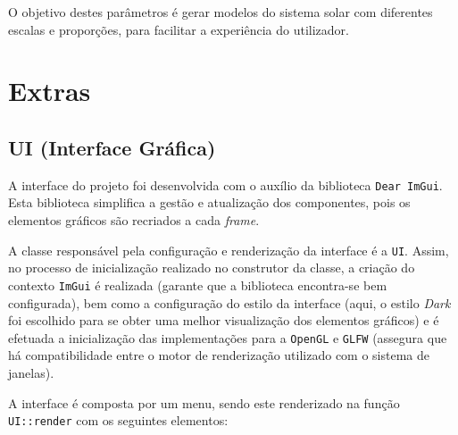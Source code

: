 \documentclass[12pt, a4paper]{article}
\begin{document}
O objetivo destes parâmetros é gerar modelos do sistema solar com diferentes escalas e
proporções, para facilitar a experiência do utilizador.

\section{Extras}

\subsection{UI (Interface Gráfica)}

A interface do projeto foi desenvolvida com o auxílio da biblioteca \texttt{Dear ImGui}. Esta
biblioteca simplifica a gestão e atualização dos componentes, pois os elementos gráficos são
recriados a cada \textit{frame}.

A classe responsável pela configuração e renderização da interface é a \texttt{UI}.
Assim, no processo de inicialização realizado no construtor da classe, a criação do contexto
\texttt{ImGui} é realizada (garante que a biblioteca encontra-se bem configurada), bem como a
configuração do estilo da interface (aqui, o estilo \textit{Dark} foi escolhido para se obter uma
melhor visualização dos elementos gráficos) e é efetuada a inicialização das implementações para a
\texttt{OpenGL} e \texttt{GLFW} (assegura que há compatibilidade entre o motor de renderização
utilizado com o sistema de janelas).

A interface é composta por um menu, sendo este renderizado na função \texttt{UI::render} com os
seguintes elementos:
\end{document}
